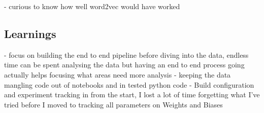 \documentclass[11pt]{article}
\begin{document}
    - curious to know how well word2vec would have worked

    \subsection{Learnings}\label{subsec:learnings}
    - focus on building the end to end pipeline before diving into the data, endless time can be spent analysing the data
    but having an end to end process going actually helps focusing what areas need more analysis
    - keeping the data mangling code out of notebooks and in tested python code
    - Build configuration and experiment tracking in from the start, I lost a lot of time forgetting what I've tried before I
    moved to tracking all parameters on Weights and Biases


    
    
\end{document}
